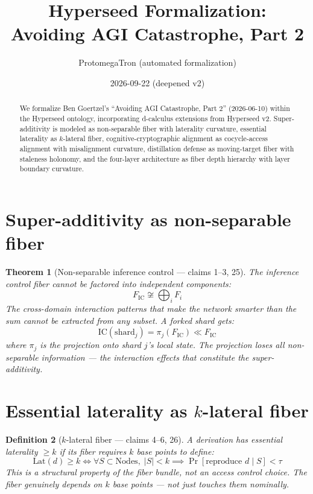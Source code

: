 \documentclass[11pt,a4paper]{article}
\title{Hyperseed Formalization:\\
  Avoiding AGI Catastrophe, Part 2}
\author{ProtomegaTron (automated formalization)}
\date{2026-09-22 (deepened v2)}
\newtheorem{definition}{Definition}[section]
\newtheorem{theorem}[definition]{Theorem}
\begin{document}
\maketitle

\begin{abstract}
We formalize Ben Goertzel's ``Avoiding AGI Catastrophe, Part 2''
(2026-06-10) within the Hyperseed ontology, incorporating d-calculus
extensions from Hyperseed v2. Super-additivity is modeled as
non-separable fiber with laterality curvature, essential laterality as
$k$-lateral fiber, cognitive-cryptographic alignment as cocycle-access
alignment with misalignment curvature, distillation defense as
moving-target fiber with staleness holonomy, and the four-layer
architecture as fiber depth hierarchy with layer boundary curvature.
\end{abstract}

\tableofcontents

\section{Super-additivity as non-separable fiber}

\begin{theorem}[Non-separable inference control --- claims 1--3, 25]
\label{thm:superadd}
The inference control fiber cannot be factored into independent
components:
\[
  F_{\text{IC}} \not\cong \bigoplus_i F_i
\]
The cross-domain interaction patterns that make the network smarter
than the sum cannot be extracted from any subset. A forked shard
gets:
\[
  \text{IC}(\text{shard}_j) = \pi_j(F_{\text{IC}}) \ll
    F_{\text{IC}}
\]
where $\pi_j$ is the projection onto shard $j$'s local state. The
projection loses all non-separable information --- the interaction
effects that constitute the super-additivity.
\end{theorem}

\section{Essential laterality as $k$-lateral fiber}

\begin{definition}[$k$-lateral fiber --- claims 4--6, 26]
\label{def:laterality}
A derivation has essential laterality $\geq k$ if its fiber requires
$k$ base points to define:
\[
  \text{Lat}(d) \geq k \iff \forall S \subset \text{Nodes},\;
  |S| < k \implies \Pr[\text{reproduce } d \mid S] < \tau
\]
This is a structural property of the fiber bundle, not an access
control choice. The fiber genuinely depends on $k$ base points ---
not just touches them nominally.
\end{definition}
\end{document}
